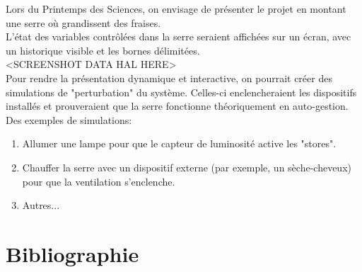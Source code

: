 \documentclass[a4paper,10pt]{article}
\begin{document}
Lors du Printemps des Sciences, on envisage de présenter le projet en montant une serre où grandissent des fraises. \\

L'état des variables contrôlées dans la serre seraient affichées sur un écran, avec un historique visible et les bornes délimitées. \\

<SCREENSHOT DATA HAL HERE> \\

Pour rendre la présentation dynamique et interactive, on pourrait créer des simulations de "perturbation" du système. Celles-ci enclencheraient les dispositifs installés et prouveraient que la serre fonctionne théoriquement en auto-gestion. Des exemples de simulations: \\

\begin{enumerate}
	\item Allumer une lampe pour que le capteur de luminosité active les "stores".
	\item Chauffer la serre avec un dispositif externe (par exemple, un sèche-cheveux) pour que la ventilation s'enclenche.
	\item Autres... \\
\end{enumerate}

\section{Bibliographie}
\end{document}
